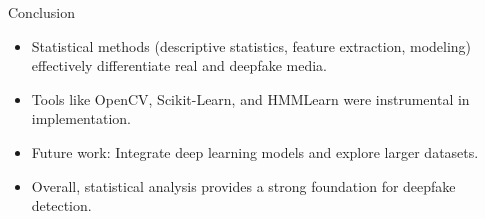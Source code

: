 \documentclass{beamer}
\begin{document}
\begin{frame}{Conclusion}
    \begin{itemize}
        \item Statistical methods (descriptive statistics, feature extraction, modeling) effectively differentiate real and deepfake media.
        \item Tools like OpenCV, Scikit-Learn, and HMMLearn were instrumental in implementation.
        \item Future work: Integrate deep learning models and explore larger datasets.
        \item Overall, statistical analysis provides a strong foundation for deepfake detection.
    \end{itemize}
\end{frame}
\end{document}
